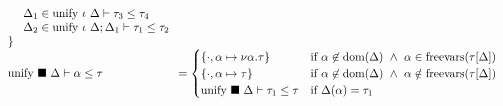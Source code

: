 \documentclass[sigplan,screen]{acmart}
\begin{document}
\begin{figure*}[h]
\[\begin{array}{l @{} l}
\begin{array}[t]{@{} l}
        \ \ \ \ \Delta_1 \in \text{unify } \iota\ \Delta \vdash \tau_3 \leq \tau_4
        \\
        \ \ \ \ \Delta_2 \in \text{unify } \iota\ \Delta;\Delta_1 \vdash \tau_1 \leq \tau_2
        \\
        \}
      \end{array}
      \\
      \text{unify } \blacksquare\ \Delta \vdash \alpha \leq \tau	
      &{} =
      \begin{cases}  
        \{ \cdot,\alpha \mapsto \nu\alpha.\tau \}
        & \text{if } 
        \alpha \not\in \text{dom}(\Delta) \ \wedge\
        \alpha \in \text{freevars}(\tau[\Delta])
        \\
        \{ \cdot,\alpha \mapsto \tau \}
        & \text{if } 
        \alpha \not\in \text{dom}(\Delta) \ \wedge\
        \alpha \notin \text{freevars}(\tau[\Delta])
        \\
        \text{unify } \blacksquare\ \Delta \vdash \tau_1 \leq \tau
        &\text{if }
        \Delta(\alpha) = \tau_1
      \end{cases}
      \\


\end{array}\]
\end{figure*}
\end{document}

